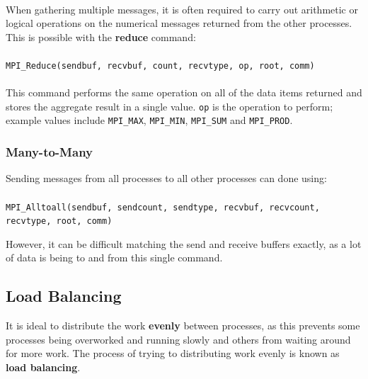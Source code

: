 \documentclass{article}
\begin{document}
\paragraph{}

When gathering multiple messages, it is often required to carry out arithmetic or logical operations on the numerical messages returned from the other processes. This is possible with the \textbf{reduce} command:

\paragraph{} \texttt{MPI\_Reduce(sendbuf, recvbuf, count, recvtype, op, root, comm)}
\paragraph{}

This command performs the same operation on all of the data items returned and stores the aggregate result in a single value. \texttt{op} is the operation to perform; example values include \texttt{MPI\_MAX}, \texttt{MPI\_MIN}, \texttt{MPI\_SUM} and \texttt{MPI\_PROD}.

\subsubsection{Many-to-Many}

Sending messages from all processes to all other processes can done using:

\paragraph{} \texttt{MPI\_Alltoall(sendbuf, sendcount, sendtype, recvbuf, recvcount, recvtype, root, comm)}

However, it can be difficult matching the send and receive buffers exactly, as a lot of data is being to and from this single command.

\subsection{Load Balancing}

It is ideal to distribute the work \textbf{evenly} between processes, as this prevents some processes being overworked and running slowly and others from waiting around for more work. The process of trying to distributing work evenly is known as \textbf{load balancing}.
\end{document}
